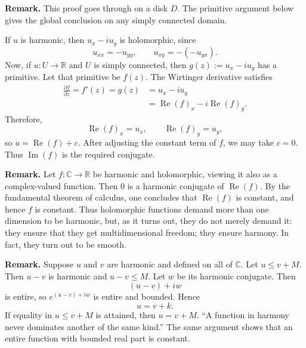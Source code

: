 \documentclass[11pt,a4paper]{article}
\begin{document}
\textbf{Remark.}
This proof goes through on a disk $D$. The primitive argument below gives the global conclusion on any simply connected domain.

If $u$ is harmonic, then \(u_x-iu_y\)
is holomorphic, since
\[
u_{xx}=-u_{yy},
\qquad
u_{xy}=-(-u_{yx}).
\]
Now, if $u\colon U\to\mathbb R$ and $U$ is simply connected, then $g(z):=u_x-iu_y$ has a primitive. Let that primitive be $f(z)$. The Wirtinger derivative satisfies
\begin{align*}
\frac{\partial f}{\partial z}
=f'(z)
=g(z)
&=u_x-iu_y\\
&=\operatorname{Re}(f)_x-i\operatorname{Re}(f)_y.
\end{align*}
Therefore,
\[
\operatorname{Re}(f)_x=u_x,
\qquad
\operatorname{Re}(f)_y=u_y,
\]
so \(u=\operatorname{Re}(f)+c.\) After adjusting the constant term of $f$, we may take $c=0$.
Thus $\operatorname{Im}(f)$ is the required conjugate.

\textbf{Remark.}
Let $f\colon\mathbb C\to\mathbb R$ be harmonic and holomorphic, viewing it also as a complex-valued function. Then $0$ is a harmonic conjugate of $\operatorname{Re}(f)$. By the fundamental theorem of calculus, one concludes that $\operatorname{Re}(f)$ is constant, and hence $f$ is constant. Thus holomorphic functions demand more than one dimension to be harmonic, but, as it turns out, they do not merely demand it: they ensure that they get multidimensional freedom; they ensure harmony. In fact, they turn out to be smooth.


\textbf{Remark.}
Suppose $u$ and $v$ are harmonic and defined on all of $\mathbb C$. Let \(u\leq v+M.\)
Then $u-v$ is harmonic and $u-v\leq M$. Let $w$ be its harmonic conjugate. Then
\[
(u-v)+iw
\]
is entire, so \(e^{(u-v)+iw}\)
is entire and bounded. Hence
\[
u=v+k.
\]
If equality in $u\leq v+M$ is attained, then $u=v+M$. ``A function in harmony never dominates another of the same kind.'' The same argument shows that an entire function with bounded real part is constant.
\end{document}
